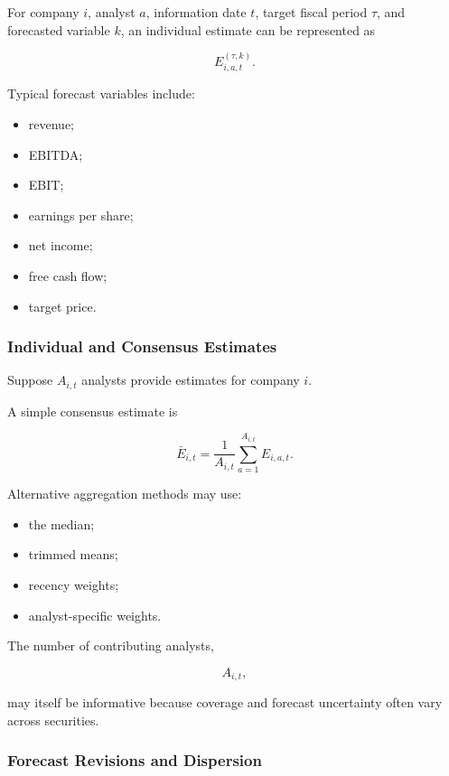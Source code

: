 \documentclass[11pt,a4paper]{article}
\begin{document}
For company $i$, analyst $a$, information date $t$, target fiscal period
$\tau$, and forecasted variable $k$, an individual estimate can be represented
as

\begin{equation}
E_{i,a,t}^{(\tau,k)}.
\end{equation}

Typical forecast variables include:

\begin{itemize}
    \item revenue;
    \item EBITDA;
    \item EBIT;
    \item earnings per share;
    \item net income;
    \item free cash flow;
    \item target price.
\end{itemize}


\subsubsection{Individual and Consensus Estimates}

Suppose $A_{i,t}$ analysts provide estimates for company $i$.

A simple consensus estimate is

\begin{equation}
\boxed{
\bar{E}_{i,t}
=
\frac{1}{A_{i,t}}
\sum_{a=1}^{A_{i,t}}
E_{i,a,t}.
}
\end{equation}

Alternative aggregation methods may use:

\begin{itemize}
    \item the median;
    \item trimmed means;
    \item recency weights;
    \item analyst-specific weights.
\end{itemize}

The number of contributing analysts,

\begin{equation}
A_{i,t},
\end{equation}

may itself be informative because coverage and forecast uncertainty often vary
across securities.


\subsubsection{Forecast Revisions and Dispersion}
\end{document}
